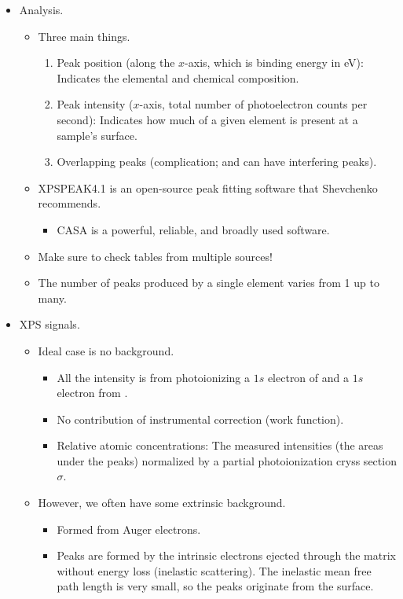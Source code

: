 \documentclass[../notes.tex]{subfiles}
\begin{document}
\begin{itemize}
    \item Analysis.
    \begin{itemize}
        \item Three main things.
        \begin{enumerate}
            \item Peak position (along the $x$-axis, which is binding energy in \si{\electronvolt}): Indicates the elemental and chemical composition.
            \item Peak intensity ($x$-axis, total number of photoelectron counts per second): Indicates how much of a given element is present at a sample's surface.
            \item Overlapping peaks (complication;  and  can have interfering peaks).
        \end{enumerate}
        \item XPSPEAK4.1 is an open-source peak fitting software that Shevchenko recommends.
        \begin{itemize}
            \item CASA is a powerful, reliable, and broadly used software.
        \end{itemize}
        \item Make sure to check tables from multiple sources!
        \item The number of peaks produced by a single element varies from 1 up to many.
    \end{itemize}
    \item XPS signals.
    \begin{itemize}
        \item Ideal case is no background.
        \begin{itemize}
            \item All the intensity is from photoionizing a $1s$ electron of  and a $1s$ electron from .
            \item No contribution of instrumental correction (work function).
            \item Relative atomic concentrations: The measured intensities (the areas under the peaks) normalized by a partial photoionization cryss section $\sigma$.
        \end{itemize}
        \item However, we often have some extrinsic background.
        \begin{itemize}
            \item Formed from Auger electrons.
            \item Peaks are formed by the intrinsic electrons ejected through the  matrix without energy loss (inelastic scattering). The inelastic mean free path length is very small, so the peaks originate from the surface.

\end{itemize}
\end{itemize}
\end{itemize}
\end{document}
